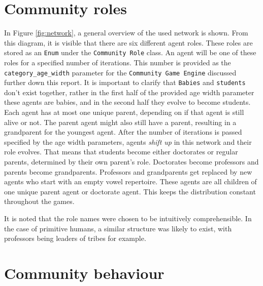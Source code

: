 \newpage



\section{Community roles}
\label{sec:community_roles}

In Figure \ref{fig:network}, a general overview of the used network is shown.
From this diagram, it is visible that there are six different agent roles.
These roles are stored as an \texttt{Enum} under the \texttt{Community Role} class.
An agent will be one of these roles for a specified number of iterations.
This number is provided as the \texttt{category\_age\_width} parameter for the \texttt{Community Game Engine} discussed further down this report.
It is important to clarify that \texttt{Babies} and \texttt{students} don't exist together, rather in the first half of the provided age width parameter these agents are babies, and in the second half they evolve to become students.
Each agent has at most one unique parent, depending on if that agent is still alive or not.
The parent agent might also still have a parent, resulting in a grandparent for the youngest agent.
After the number of iterations is passed specified by the age width parameters, agents \textit{shift up} in this network and their role evolves.
That means that students become either doctorates or regular parents, determined by their own parent's role.
Doctorates become professors and parents become grandparents.
Professors and grandparents get replaced by new agents who start with an empty vowel repertoire.
These agents are all children of one unique parent agent or doctorate agent.
This keeps the distribution constant throughout the games.

It is noted that the role names were chosen to be intuitively comprehensible.
In the case of primitive humans, a similar structure was likely to exist, with professors being leaders of tribes for example.



\section{Community behaviour}
\label{sec:community_behaviour}

